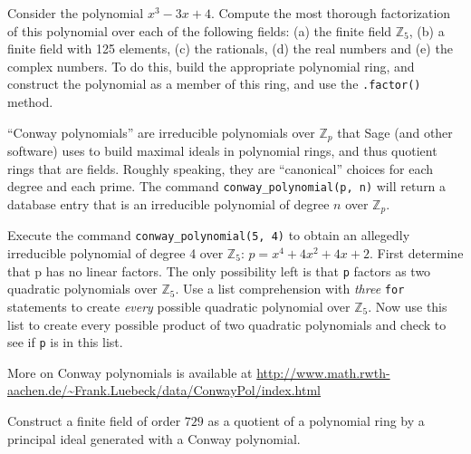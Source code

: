 \begin{sageverbatim}\end{sageverbatim}
%
%
Consider the polynomial $x^3-3x+4$.  Compute the most thorough factorization of this polynomial over each of the following fields:  (a) the finite field ${\mathbb Z}_5$, (b) a finite field with 125 elements, (c) the rationals, (d) the real numbers and (e) the complex numbers.  To do this, build the appropriate polynomial ring, and construct the polynomial as a member of this ring, and use the \verb?.factor()? method.
\begin{sageverbatim}\end{sageverbatim}
%
%
``Conway polynomials'' are irreducible polynomials over ${\mathbb Z}_p$ that Sage (and other software) uses to build maximal ideals in polynomial rings, and thus quotient rings that are fields. Roughly speaking, they are ``canonical'' choices for each degree and each prime.  The command \verb?conway_polynomial(p, n)? will return a database entry that is an irreducible polynomial of degree $n$ over ${\mathbb Z}_p$.\par
%
Execute the command \verb?conway_polynomial(5, 4)? to obtain an allegedly irreducible polynomial of degree 4 over ${\mathbb Z}_5$:  $p = x^{4} + 4x^{2} + 4x + 2$.  First determine that p has no linear factors.  The only possibility left is that \verb?p? factors as two quadratic polynomials over ${\mathbb Z}_5$.  Use a list comprehension with \emph{three} \verb?for? statements to create \emph{every} possible quadratic polynomial over ${\mathbb Z}_5$.  Now use this list to create every possible product of two quadratic polynomials and check to see if \verb?p? is in this list.\par
%
More on Conway polynomials is available at
\url{http://www.math.rwth-aachen.de/~Frank.Luebeck/data/ConwayPol/index.html}
\begin{sageverbatim}\end{sageverbatim}
%
%
Construct a finite field of order $729$ as a quotient of a polynomial ring by a principal ideal generated with a Conway polynomial.
\begin{sageverbatim}\end{sageverbatim}
